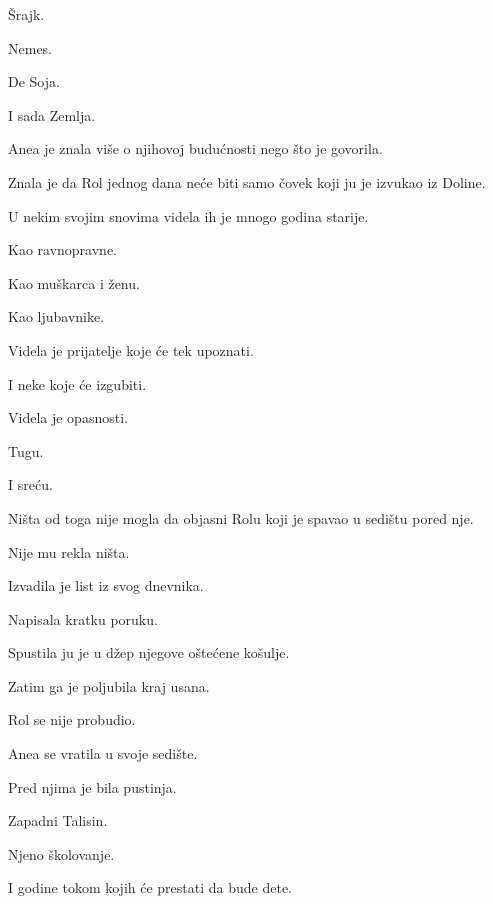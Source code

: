 Šrajk.

Nemes.

De Soja.

\bigskip

I sada Zemlja.

\bigskip

Anea je znala više o njihovoj budućnosti nego što je govorila.

\bigskip

Znala je da Rol jednog dana neće biti samo čovek koji ju je izvukao iz Doline.

\bigskip

U nekim svojim snovima videla ih je mnogo godina starije.

Kao ravnopravne.

Kao muškarca i ženu.

Kao ljubavnike.

\bigskip

Videla je prijatelje koje će tek upoznati.

I neke koje će izgubiti.

\bigskip

Videla je opasnosti.

Tugu.

I sreću.

\bigskip

Ništa od toga nije mogla da objasni Rolu koji je spavao u sedištu pored nje.

\bigskip

Nije mu rekla ništa.

\bigskip

Izvadila je list iz svog dnevnika.

Napisala kratku poruku.

\bigskip

Spustila ju je u džep njegove oštećene košulje.

\bigskip

Zatim ga je poljubila kraj usana.

\bigskip

Rol se nije probudio.

\bigskip

Anea se vratila u svoje sedište.

\bigskip

Pred njima je bila pustinja.

Zapadni Talisin.

Njeno školovanje.

\bigskip

I godine tokom kojih će prestati da bude dete.

